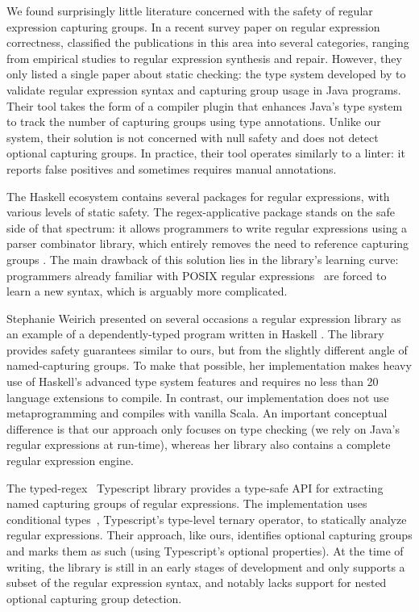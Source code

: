 We found surprisingly little literature concerned with the safety of regular expression capturing groups.
In a recent survey paper on regular expression correctness, \citet{li2021ensuring} classified the publications in this area into several categories, ranging from empirical studies to regular expression synthesis and repair.
However, they only listed a single paper about static checking: the type system developed by \citet{spishak2012type} to validate regular expression syntax and capturing group usage in Java programs.
Their tool takes the form of a compiler plugin that enhances Java's type system to track the number of capturing groups using type annotations.
Unlike our system, their solution is not concerned with null safety and does not detect optional capturing groups.
In practice, their tool operates similarly to a linter: it reports false positives and sometimes requires manual annotations.

The Haskell ecosystem contains several packages for regular expressions, with various levels of static safety.
The regex-applicative package stands on the safe side of that spectrum: it allows programmers to write regular expressions using a parser combinator library, which entirely removes the need to reference capturing groups \citep{cheplyaka2011regex}.
The main drawback of this solution lies in the library's learning curve: programmers already familiar with POSIX regular expressions~\citep{ieee2018the} are forced to learn a new syntax, which is arguably more complicated.

Stephanie Weirich presented on several occasions a regular expression library as an example of a dependently-typed program written in Haskell \citep{weirich2014examples}.
The library provides safety guarantees similar to ours, but from the slightly different angle of named-capturing groups.
To make that possible, her implementation makes heavy use of Haskell's advanced type system features and requires no less than 20 language extensions to compile.
In contrast, our implementation does not use metaprogramming and compiles with vanilla Scala.
An important conceptual difference is that our approach only focuses on type checking (we rely on Java's regular expressions at run-time), whereas her library also contains a complete regular expression engine.

The typed-regex~\citep{akshay2021typed} Typescript library provides a type-safe API for extracting named capturing groups of regular expressions.
The implementation uses conditional types~\citep{microsoft2020typescript}, Typescript's type-level ternary operator, to statically analyze regular expressions.
Their approach, like ours, identifies optional capturing groups and marks them as such (using Typescript's optional properties).
At the time of writing, the library is still in an early stages of development and only supports a subset of the regular expression syntax, and notably lacks support for nested optional capturing group detection.

